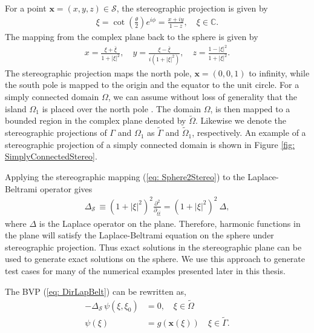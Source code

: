 \documentclass{sfuthesis}
\begin{document}
For a point $\mathbf{x}=(x, y, z) \in \mathcal{S}$, the stereographic projection is given by 
\begin{align}
	\xi = \cot \left(\frac{\theta}{2}\right) e^{i\phi} = \frac{x+iy}{1-z}, \quad \xi \in \mathbb{C}. \label{eq: Sphere2Stereo}
\end{align}
The mapping from the complex plane back to the sphere is given by
\begin{align}
	x=\frac{\xi + \bar{\xi}}{1+ {|\xi|}^2}, \quad y=\frac{\xi - \bar{\xi}}{i(1+{|\xi|}^2)}, \quad z=\frac{1-{|\xi|}^2}{1+{|\xi|}^2} \label{eq: Stereo2Sphere}.
\end{align}
The stereographic projection maps the north pole, $\mathbf{x}= (0,0,1)$ to infinity, while the south pole is mapped to the origin and the equator to the unit circle. For a simply connected domain $\Omega$, we can assume without loss of generality that the island $\Omega_1$ is placed over the north pole \cite{KropNig2014}. The domain $\Omega$, is then mapped to a bounded region in the complex plane denoted by $\tilde{\Omega}$. Likewise we denote the stereographic projections of $\Gamma$ and $\Omega_1$ as $\tilde{\Gamma}$ and $\tilde{\Omega}_1$, respectively. An example of a stereographic projection of a simply connected domain is shown in Figure \ref{fig: SimplyConnectedStereo}. 

Applying the stereographic mapping (\ref{eq: Sphere2Stereo}) to the Laplace-Beltrami operator gives
\begin{align*}
	\Delta_{\mathcal{S} \ } \equiv {(1+{|\xi|}^2)}^2\frac{{\partial}^2}{\partial_{\xi \bar{\xi}}}= {(1+{|\xi|}^2)}^2 \ \Delta, 
\end{align*} 
where $\Delta$ is the Laplace operator on the plane. Therefore, harmonic functions in the plane will satisfy the Laplace-Beltrami equation on the sphere under stereographic projection. Thus exact solutions in the stereographic plane can be used to generate exact solutions on the sphere. We use this approach to generate test cases for many of the numerical examples presented later in this thesis. 

The BVP (\ref{eq: DirLapBelt}) can be rewritten as, 
\begin{align*}
	-\Delta_{\mathcal{S}\ } \psi(\xi, \xi_0)&=0,  \quad \xi \in \tilde{\Omega}\\
\psi(\xi)&=g(\mathbf{x}(\xi)) \quad \xi \in \tilde{\Gamma}.
\end{align*} 
\end{document}
